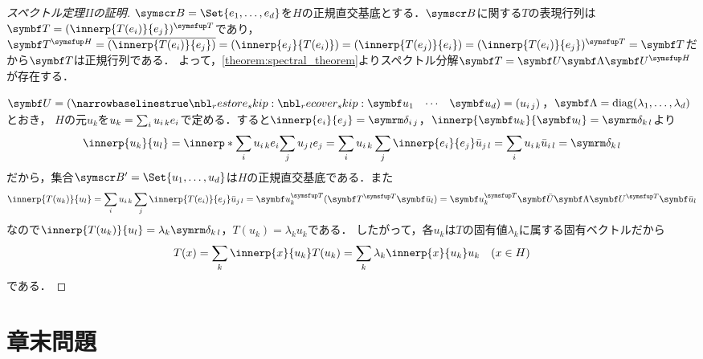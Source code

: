 \documentclass[../../main]{subfiles}
\begin{document}
\begin{proof}[スペクトル定理IIの証明]
  \(\basis{B}=\Set{e_1,\dots,e_d}\)を\(H\)の正規直交基底とする．\(\basis{B}\)に関する\(T\)の表現行列は\(\mat{T}=\trps{\matfence{\innerp{T(e_i)}{e_j}}}\)であり，
  \(\htrps{\mat{T}}=\conj*{\matfence{\innerp{T(e_i)}{e_j}}}=\matfence{\innerp{e_j}{T(e_i)}}=\matfence{\innerp{T(e_j)}{e_i}}=\trps{\matfence{\innerp{T(e_i)}{e_j}}}=\mat{T}\)だから\(\mat{T}\)は正規行列である．
  よって，\cref{theorem:spectral_theorem}よりスペクトル分解\(\mat{T}=\mat{U}\mat{\Lambda}\htrps{\mat{U}}\)が存在する．

  \(\mat{U}=\rowvect{\vect{u}_1 & \cdots & \vect{u}_d}=\matfence{\midx{u}{i}{j}}\)，\(\mat{\Lambda}=\diag(\lambda_1,\dots,\lambda_d)\)とおき，
  \(H\)の元\(u_k\)を\(u_k=\sum_iu_{i\,k}e_i\)で定める．すると\(\innerp{e_i}{e_j}=\kdelta{i}{j}\)，\(\innerp{\vect{u}_k}{\vect{u}_l}=\kdelta{k}{l}\)より
  \[
    \innerp{u_k}{u_l} = \innerp*{\sum_i\midx{u}{i}{k}e_i}{\sum_j\midx{u}{j}{l}e_j}
    = \sum_i\midx{u}{i}{k}\sum_j\innerp{e_i}{e_j}\midx{\conj{u}}{j}{l}
    = \sum_i\midx{u}{i}{k}\midx{\conj{u}}{i}{l}
    = \kdelta{k}{l}
  \]
  だから，集合\(\basis{B}'=\Set{u_1,\dots,u_d}\)は\(H\)の正規直交基底である．また
  \[
    \innerp{T(u_k)}{u_l} = \sum_i\midx{u}{i}{k}\sum_j\innerp{T(e_i)}{e_j}\midx{\conj{u}}{j}{l}
    = \trps{\vect{u}_k}(\trps{\mat{T}}\vect{\conj{u}}_l)
    = \trps{\vect{u}_k}\mat{\conj{U}}\mat{\Lambda}\trps{\mat{U}}\vect{\conj{u}}_l
  \]
  なので\(\innerp{T(u_k)}{u_l}=\lambda_k\kdelta{k}{l}\)，\(T(u_k)=\lambda_ku_k\)である．
  したがって，各\(u_k\)は\(T\)の固有値\(\lambda_k\)に属する固有ベクトルだから
  \[
    T(x) = \sum_k\innerp{x}{u_k}T(u_k)
    = \sum_k\lambda_k\innerp{x}{u_k}u_k\quad(x\in H)
  \]
  である．
\end{proof}

\section{章末問題}
\end{document}
